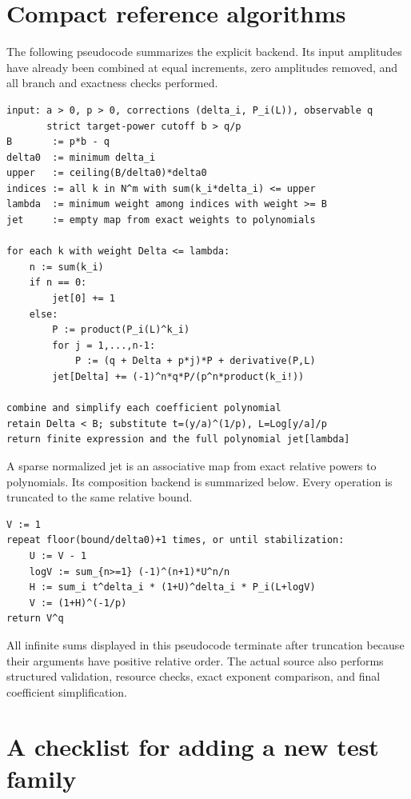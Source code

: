 \documentclass[11pt,a4paper]{article}
\numberwithin{equation}{section}
\theoremstyle{definition}\newtheorem{definition}[theorem]{Definition}
\theoremstyle{remark}\newtheorem{remark}[theorem]{Remark}
\begin{document}
\appendix
\section{Compact reference algorithms}
\label{app:algorithms}

The following pseudocode summarizes the explicit backend. Its input
amplitudes have already been combined at equal increments, zero
amplitudes removed, and all branch and exactness checks performed.

\begin{lstlisting}
input: a > 0, p > 0, corrections (delta_i, P_i(L)), observable q
       strict target-power cutoff b > q/p
B       := p*b - q
delta0  := minimum delta_i
upper   := ceiling(B/delta0)*delta0
indices := all k in N^m with sum(k_i*delta_i) <= upper
lambda  := minimum weight among indices with weight >= B
jet     := empty map from exact weights to polynomials

for each k with weight Delta <= lambda:
    n := sum(k_i)
    if n == 0:
        jet[0] += 1
    else:
        P := product(P_i(L)^k_i)
        for j = 1,...,n-1:
            P := (q + Delta + p*j)*P + derivative(P,L)
        jet[Delta] += (-1)^n*q*P/(p^n*product(k_i!))

combine and simplify each coefficient polynomial
retain Delta < B; substitute t=(y/a)^(1/p), L=Log[y/a]/p
return finite expression and the full polynomial jet[lambda]
\end{lstlisting}

A sparse normalized jet is an associative map from exact relative powers
to polynomials. Its composition backend is summarized below. Every
operation is truncated to the same relative bound.
\begin{lstlisting}
V := 1
repeat floor(bound/delta0)+1 times, or until stabilization:
    U := V - 1
    logV := sum_{n>=1} (-1)^(n+1)*U^n/n
    H := sum_i t^delta_i * (1+U)^delta_i * P_i(L+logV)
    V := (1+H)^(-1/p)
return V^q
\end{lstlisting}
All infinite sums displayed in this pseudocode terminate after
truncation because their arguments have positive relative order.
The actual source also performs structured validation, resource checks,
exact exponent comparison, and final coefficient simplification.

\section{A checklist for adding a new test family}
\end{document}
